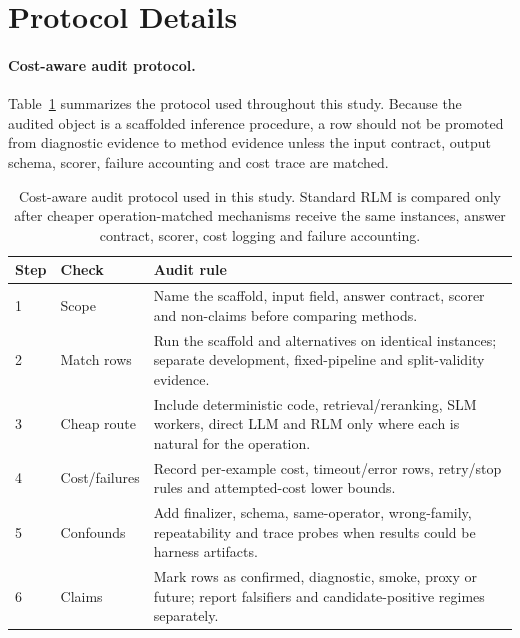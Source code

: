 \renewcommand{\topfraction}{0.95}
\renewcommand{\dbltopfraction}{0.95}
\renewcommand{\textfraction}{0.05}
\renewcommand{\floatpagefraction}{0.85}
\renewcommand{\dblfloatpagefraction}{0.85}
\setcounter{topnumber}{4}
\setcounter{dbltopnumber}{4}
\setcounter{totalnumber}{8}

\FloatBarrier
\section{Protocol Details}
\label{app:protocol}

\paragraph{Cost-aware audit protocol.}
Table~\ref{tab:supp-cost-aware-audit-protocol} summarizes the protocol used throughout this study. Because the audited object is a scaffolded inference procedure, a row should not be promoted from diagnostic evidence to method evidence unless the input contract, output schema, scorer, failure accounting and cost trace are matched.

\begin{table}[!htbp]
\centering
\small
\setlength{\tabcolsep}{3pt}
\begin{tabular}{@{}p{0.75cm}p{1.8cm}p{4.4cm}@{}}
\toprule
\textbf{Step} & \textbf{Check} & \textbf{Audit rule} \\
\midrule
1 & Scope & Name the scaffold, input field, answer contract, scorer and non-claims before comparing methods. \\
2 & Match rows & Run the scaffold and alternatives on identical instances; separate development, fixed-pipeline and split-validity evidence. \\
3 & Cheap route & Include deterministic code, retrieval/reranking, SLM workers, direct LLM and RLM only where each is natural for the operation. \\
4 & Cost/failures & Record per-example cost, timeout/error rows, retry/stop rules and attempted-cost lower bounds. \\
5 & Confounds & Add finalizer, schema, same-operator, wrong-family, repeatability and trace probes when results could be harness artifacts. \\
6 & Claims & Mark rows as confirmed, diagnostic, smoke, proxy or future; report falsifiers and candidate-positive regimes separately. \\
\bottomrule
\end{tabular}
\caption{Cost-aware audit protocol used in this study. Standard RLM is compared only after cheaper operation-matched mechanisms receive the same instances, answer contract, scorer, cost logging and failure accounting.}
\label{tab:supp-cost-aware-audit-protocol}
\end{table}

